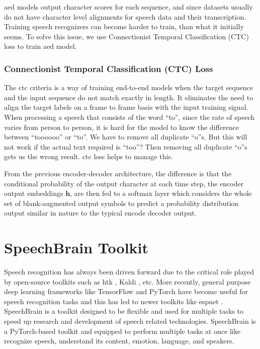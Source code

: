 \acrshort{aed} models output character scores for each sequence, and since datasets usually do not have character level alignments for speech data and their transcription. Training speech recognizers can become harder to train, than what it initially seems. To solve this issue, we use Connectionist Temporal Classification (CTC) loss to train \acrshort{aed} model.

\subsubsection{Connectionist Temporal Classification (CTC) Loss}
\label{section:ctc}
The \acrshort{ctc} criteria is a way of training end-to-end models when the target sequence and the input sequence do not match exactly in length. It eliminates the need to align the target labels on a frame to frame basis with the input training signal. When processing a speech that consists of the word ``to'', since the rate of speech varies from person to person, it is hard for the model to know the difference between ``toooooo'' or ``to''. We have to remove all duplicate ``o''s. But this will not work if the actual text required is ``too''? Then removing all duplicate ``o''s gets us the wrong result. \acrshort{ctc} loss helps to manage this.

From the previous encoder-decoder architecture, the difference is that the conditional probability of the output character at each time step, the encoder output embeddings $\mathbf{h}$, are then fed to a softmax layer which considers the whole set of blank-augmented output symbols to predict a probability distribution output similar in nature to the typical encode decoder output.


\section{SpeechBrain Toolkit}
\label{section:sb}
Speech recognition has always been driven forward due to the critical role played by open-source toolkits such as \acrshort{htk} \cite{Young2002TheBook}, Kaldi \cite{Povey2011TheToolkit}, etc. More recently, general purpose deep learning frameworks like TensorFlow \cite{Abadi2016TensorFlow:Systems} and PyTorch \cite{Paszke2019PyTorch:Library} have become useful for speech recognition tasks and this has led to newer toolkits like \acrshort{espnet} \cite{Watanabe2018ESPnet:Toolkit}. SpeechBrain \cite{Ravanelli2021SpeechBrain:Toolkit} is a toolkit designed to be flexible and used for multiple tasks to speed up research and development of speech related technologies.  SpeechBrain is a PyTorch-based toolkit and equipped to perform multiple tasks at once like recognize speech, understand its content, emotion, language, and speakers. 

